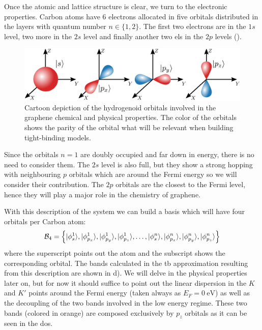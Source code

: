 Once the atomic and lattice structure is clear, we turn to the electronic properties. Carbon atoms have 6 electrons allocated in five orbitals distributed in the layers with quantum number $n\in\{1,2\}$.
The first two electrons are in the $1s$ level, two more in the $2s$ level and finally another two \acp{el} in the $2p$ levels ().
\begin{figure}[h!]
\centering
\includegraphics{graphene/figures/orbitals.pdf}
\vspace{-5pt}
\caption{Cartoon depiction of the hydrogenoid orbitals involved in the graphene chemical and physical properties. The color of the orbitals shows the parity of the orbital what will be relevant when building tight-binding models.}
\label{orbitals}
\end{figure}
\FloatBarrier
Since the orbitals $n=1$ are doubly occupied and far down in energy, there is no need to consider them. The $2s$ level is also full, but they show a strong hopping with neighbouring $p$ orbitals which are around the Fermi energy so we will consider their contribution. The $2p$ orbitals are the closest to the Fermi level, hence they will play a major role in the chemistry of graphene.
\medbreak

With this description of the system we can build a basis which will have four orbitals per Carbon atom:
\begin{equation}
  \mathcal{B}_4 = \left\{
  |\phi^1_{s}\rangle,|\phi^1_{p_x}\rangle,|\phi^1_{p_y}\rangle,|\phi^1_{p_z}\rangle,
  \dots,
  |\phi^n_{s}\rangle,|\phi^n_{p_x}\rangle,|\phi^n_{p_y}\rangle,|\phi^n_{p_z}\rangle
  \right\}
\label{basis4}
\end{equation}
where the superscript points out the atom and the subscript shows the corresponding orbital. The bands calculated in the \ac{tb} approximation resulting from this description are shown in d). We will delve in the physical properties later on, but for now it should suffice to point out the linear dispersion in the $K$ and $K'$ points around the Fermi energy (taken always as $E_F=\SI{0}{\eV}$) as well as the decoupling of the two bands involved in the low energy regime. These two bands (colored in orange) are composed exclusively by $p_z$ orbitals as it can be seen in the \ac{dos}.

